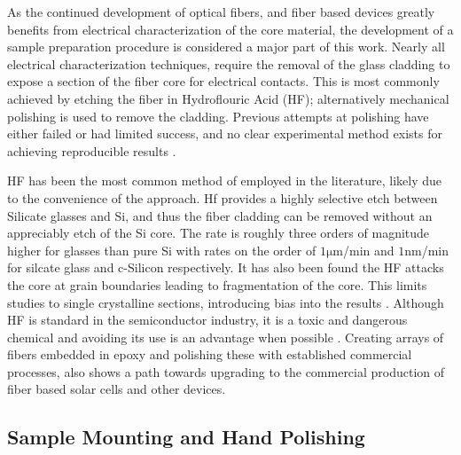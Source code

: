 As the continued development of optical fibers, and fiber based devices greatly benefits from electrical characterization of the core material, the development of a sample preparation procedure is considered a major part of this work. Nearly all electrical characterization techniques, require the removal of the glass cladding to expose a section of the fiber core for electrical contacts. This is most commonly achieved by etching the fiber in Hydroflouric Acid (HF); alternatively mechanical polishing is used to remove the cladding. Previous attempts at polishing have either failed or had limited success, and no clear experimental method exists for achieving reproducible results \cite{KristinKristin_thesis_final,LapointeElectricalFibres}. 

HF has been the most common method of employed in the literature, likely due to the convenience of the approach. Hf provides a highly selective etch between Silicate glasses and Si, and thus the fiber cladding can be removed without an appreciably etch of the Si core. The rate is roughly three orders of magnitude higher for glasses than pure Si with rates on the order of $1\si{\micro\meter}$/min \cite{Liu2013UnexpectedlyAcid} and $1\si{\nano\meter}$/min \cite{Park2017AApplication} for silcate glass and c-Silicon respectively. It has also been found the HF attacks the core at grain boundaries leading to fragmentation of the core. This limits studies to single crystalline sections, introducing bias into the results  \cite{LapointeElectricalFibres}. Although HF is standard in the semiconductor industry, it is a toxic and dangerous chemical and avoiding its use is an advantage when possible \cite{Product2015SafetySheet}. Creating arrays of fibers embedded in epoxy and polishing these with established commercial processes, also shows a path towards upgrading to the commercial production of fiber based solar cells \cite{} and other devices.

\subsection{Sample Mounting and Hand Polishing}

